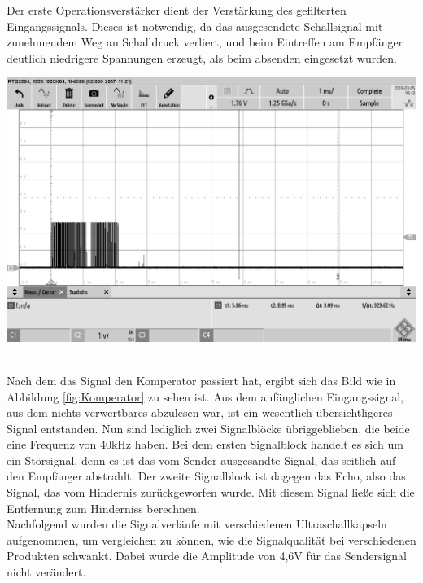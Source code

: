 Der erste Operationsverstärker dient der Verstärkung des gefilterten Eingangssignals. Dieses ist notwendig, da das ausgesendete Schallsignal mit zunehmendem Weg an Schalldruck verliert, und beim Eintreffen am Empfänger deutlich niedrigere Spannungen erzeugt, als beim absenden eingesetzt wurden. \\
\begin{minipage}{0.6\textwidth}
\includegraphics[width=1\textwidth, draft]{Abbildungen/Signal-nach-Komperator.png}\label{fig:Komperator}
\end{minipage}\\
Nach dem das Signal den Komperator passiert hat, ergibt sich das Bild wie in Abbildung \ref{fig:Komperator} zu sehen ist. Aus dem anfänglichen Eingangssignal, aus dem nichts verwertbares abzulesen war, ist ein wesentlich übersichtligeres Signal entstanden. Nun sind lediglich zwei Signalblöcke übriggeblieben, die beide eine Frequenz von 40kHz haben. Bei dem ersten Signalblock handelt es sich um ein Störsignal, denn es ist das vom Sender ausgesandte Signal, das seitlich auf den Empfänger abstrahlt. Der zweite Signalblock ist dagegen das Echo, also das Signal, das vom Hindernis zurückgeworfen wurde. Mit diesem Signal ließe sich die Entfernung zum Hinderniss berechnen.\\
Nachfolgend wurden die Signalverläufe mit verschiedenen Ultraschallkapseln aufgenommen, um vergleichen zu können, wie die Signalqualität bei verschiedenen Produkten schwankt. Dabei wurde die Amplitude von 4,6V für das Sendersignal nicht verändert.\\
